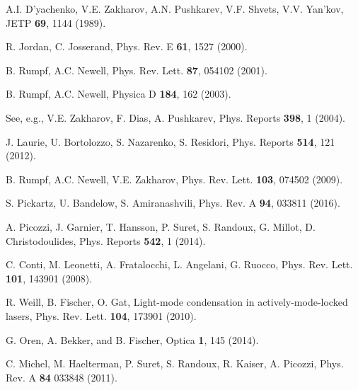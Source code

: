 \documentclass[pra,twocolumn,showpacs,preprintnumbers,amsmath,amssymb]{revtex4}
\begin{document}
\begin{thebibliography}{99}
A.I. D'yachenko, V.E. Zakharov, A.N. Pushkarev, V.F. Shvets, V.V. Yan'kov, 
JETP {\bf 69}, 1144 (1989).



R. Jordan, C. Josserand, 
Phys. Rev. E  {\bf 61}, 1527 (2000).

B. Rumpf, A.C. Newell, Phys. Rev. Lett. {\bf 87}, 054102 (2001).

B. Rumpf, A.C. Newell, 
Physica D  {\bf 184}, 162 (2003).

See, e.g., V.E. Zakharov, F. Dias, A. Pushkarev, 
Phys. Reports {\bf 398}, 1 (2004).

J. Laurie, U. Bortolozzo, S. Nazarenko, S. Residori, 
Phys. Reports {\bf 514}, 121 (2012).



B. Rumpf, A.C. Newell, V.E. Zakharov,
Phys. Rev. Lett. {\bf 103}, 074502 (2009).


S. Pickartz, U. Bandelow, S. Amiranashvili,
Phys. Rev. A {\bf 94}, 033811 (2016).

A. Picozzi, J. Garnier, T. Hansson, P. Suret, S. Randoux, G. Millot, D. Christodoulides,
Phys. Reports {\bf 542}, 1 (2014).

C. Conti, M. Leonetti, A. Fratalocchi, L. Angelani, G. Ruocco, 
Phys. Rev. Lett. {\bf 101}, 143901 (2008).

R. Weill, B. Fischer, O. Gat, Light-mode condensation in actively-mode-locked lasers, Phys. Rev. Lett. {\bf 104}, 173901 (2010).

G. Oren, A. Bekker, and B. Fischer, 
Optica {\bf 1}, 145 (2014).

C. Michel, M. Haelterman, P. Suret, S. Randoux, R. Kaiser, A. Picozzi, 
Phys. Rev. A {\bf 84} 033848 (2011).



\end{thebibliography}
\end{document}
